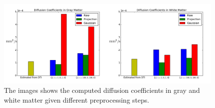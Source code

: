 \documentclass[12pt,a4paper]{article}
\begin{document}
\begin{figure}
\centering
\includegraphics[scale=0.3]{../diffcoeff.png} 
\caption{The images shows the computed diffusion coefficients in gray and white matter given different preprocessing steps.  }
\label{diffcoeff}
\end{figure}



\end{document}
